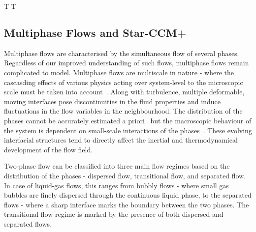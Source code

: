 T%
T%

\subsection{Multiphase Flows and Star-CCM+}
Multiphase flows are characterised by the simultaneous flow of several phases. Regardless of our 
 improved understanding 
 of such flows, multiphase flows remain complicated to model. Multiphase flows are 
 multiscale in nature - where 
 the cascasding effects of various physics acting over 
 system-level to the microscopic scale must be taken into account~\cite{ishiiThermoFluidDynamicsTwoPhase2011}. 
 Along with turbulence, multiple deformable, moving interfaces pose discontinuities 
 in the fluid properties and induce fluctuations in the flow variables in the neighbourhood. 
 The distribution of the phases cannot be accurately estimated
 a priori~\cite{yadigarogluNatureMultiphaseFlows2018} but the macroscopic 
 behaviour of the system is dependent on small-scale interactions of the 
 phases~\cite{hanrattyPhysicsGasLiquid}. These evolving interfacial structures tend
 to directly affect the inertial and thermodynamical development of the flow field.~\cite{ishiiThermoFluidDynamicsTwoPhase2011}

Two-phase flow can be classified into three main flow regimes based on the 
 distribution of the phases - dispersed flow, transitional flow, and separated flow.
 In case of liquid-gas flows, this ranges from bubbly flows - where small gas bubbles are finely dispersed through the
 continuous liquid phase, to the separated flows - where a sharp interface
 marks the boundary between the two phases.
 The transitional flow regime is marked by the presence of both dispersed and 
 separated flows.~\cite{yadigarogluNatureMultiphaseFlows2018}

